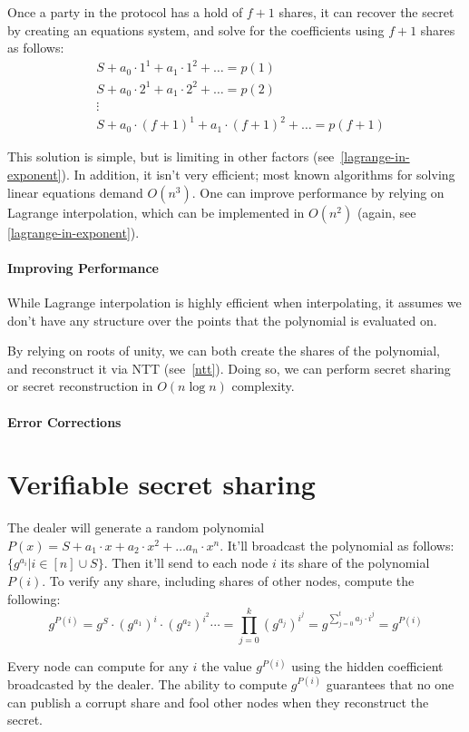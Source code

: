 Once a party in the protocol has a hold of $f+1$ shares, 
it can recover the secret by creating an equations system,
and solve for the coefficients using $f+1$ shares as follows:
\begin{align*}
  & S +a_0\cdot 1^1 + a_1\cdot 1^2  + \dots = p(1)\\
  & S +a_0\cdot 2^1 + a_1\cdot 2^2  + \dots = p(2)\\
  & \vdots \\
  & S +a_0\cdot (f+1)^1 + a_1\cdot (f+1)^2  + \dots = p(f+1)
\end{align*}


This solution is simple, but is limiting in other factors (see~\ref{lagrange-in-exponent}).
In addition, it isn't very efficient; most known algorithms for solving linear equations 
demand $O(n^3)$.
One can improve performance by relying on Lagrange interpolation, which 
can be implemented in $O(n^2)$ (again, see \ref{lagrange-in-exponent}).


\paragraph{Improving Performance}
While Lagrange interpolation is highly efficient when interpolating, it assumes we don't have 
any structure over the points that the polynomial is evaluated on.

By relying on roots of unity, we can both create the shares of the polynomial, and reconstruct it 
via NTT (see~\ref{ntt}). 
Doing so, we can perform secret sharing or secret reconstruction in $O(n\log n)$ complexity.

\paragraph{Error Corrections}
\section{Verifiable secret sharing}
The dealer will generate a random polynomial $P(x)=S+a_1\cdot x +a_2\cdot x^2 +\dots a_n\cdot x^n$. 
It'll broadcast the polynomial as follows: $\{g^{a_i} | i\in [n]\cup {S}\}$.
Then it'll send to each node $i$ its share of the polynomial $P(i)$. 
To verify any share, including shares of other nodes, compute the following: 
$$ g^{P(i)} =
 g^{S}\cdot (g^{a_1})^{i} \cdot (g^{a_2})^{i^2}\cdots  =
 \prod_{j=0}^{k} (g^{a_j})^{i^j} = 
 g^{\sum_{j=0}^{t} a_j \cdot i^j} = 
 g^{P(i)} $$

Every node can compute for any $i$ the value $g^{P(i)}$ using the hidden coefficient broadcasted by the dealer.  
The ability to compute $g^{P(i)}$ guarantees that no one can publish a corrupt share and fool other nodes when they reconstruct the secret.


